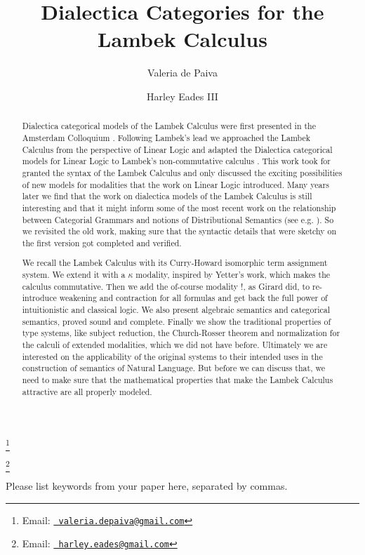 \documentclass{entcs}
\begin{document}
\begin{frontmatter}
  \title{Dialectica Categories for the Lambek Calculus}
  \author{Valeria de Paiva}
  \address{Nuance Communications, Sunnyvale, CA}

  \author{Harley Eades III}
  \address{Computer Science, Augusta University, Augusta, GA}

  \thanks[Vemail]{Email:
    \href{mailto:valeria.depaiva@gmail.com} {\texttt{\normalshape
        valeria.depaiva@gmail.com}}}

  \thanks[Hemail]{Email:
    \href{mailto:harley.eades@gmail.com} {\texttt{\normalshape
        harley.eades@gmail.com}}}
  \begin{abstract}
    Dialectica categorical models of the Lambek Calculus were first
    presented in the Amsterdam Colloquium \cite{depaiva1991}. Following
    Lambek's lead we approached the Lambek Calculus from the perspective
    of Linear Logic and adapted the Dialectica categorical models for
    Linear Logic to Lambek's non-commutative calculus
    \cite{lambek1988}. This work took for granted the syntax of the
    Lambek Calculus and only discussed the exciting possibilities of new
    models for modalities that the work on Linear Logic introduced. Many
    years later we find that the work on dialectica models of the Lambek
    Calculus is still interesting and that it might inform some of the
    most recent work on the relationship between Categorial Grammars and
    notions of Distributional Semantics (see e.g. \cite{coecke2013}).
    So we revisited the old work, making sure that the syntactic details
    that were sketchy on the first version got completed and verified.

    We recall the Lambek Calculus with its Curry-Howard isomorphic term
    assignment system. We extend it with a $\kappa$ modality, inspired by
    Yetter's work, which makes the calculus commutative. Then we add the
    of-course modality $!$, as Girard did, to re-introduce weakening and
    contraction for all formulas and get back the full power of
    intuitionistic and classical logic. We also present algebraic
    semantics and categorical semantics, proved sound and
    complete. Finally we show the traditional properties of type systems,
    like subject reduction, the Church-Rosser theorem and normalization
    for the calculi of extended modalities, which we did not have before.
    Ultimately we are interested on the applicability of the original
    systems to their intended uses in the construction of semantics of
    Natural Language. But before we can discuss that, we need to make sure
    that the mathematical properties that make the Lambek Calculus
    attractive are all properly modeled.
  \end{abstract}
\begin{keyword}
  Please list keywords from your paper here, separated by commas.
\end{keyword}
\end{frontmatter}
\end{document}
